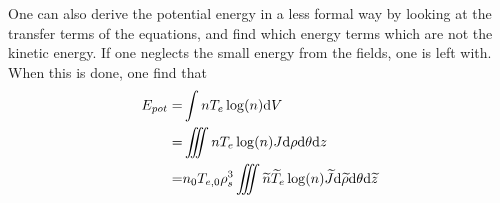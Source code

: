 One can also derive the potential energy in a less formal way by looking at the transfer terms of the equations, and find which energy terms which are not the kinetic energy.
If one neglects the small energy from the fields, one is left with.
When this is done, one find that
%
\begin{align*}
    E_{pot}
    =& \int nT_e\log(n) \text{d} V
    \\
    =& \iiint nT_e\log(n) J \text{d}\rho \text{d}\theta \text{d} z
    \\
    =& n_0T_{e,0}\rho_s^3\iiint \widetilde{ n}\widetilde{ T}_e\log(n) \widetilde{ J}
    \text{d}\widetilde{ \rho} \text{d}\theta \text{d} \widetilde{ z}
\end{align*}
